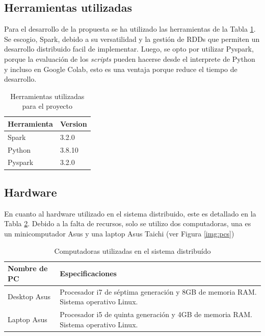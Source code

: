 \subsection{Herramientas utilizadas}

Para el desarrollo de la propuesta se ha utilizado las herramientas de la Tabla \ref{tab:tools}. Se escogio, Spark, debido a su versatilidad y la gestión de RDDs que permiten un desarrollo distribuido facil de implementar. Luego, se opto por utilizar Pyspark, porque la evaluación de los \textit{scripts} pueden hacerse desde el interprete de Python y incluso en Google Colab, esto es una ventaja porque reduce el tiempo de desarrollo.\\

\begin{table}[H]
	\centering
	\caption{Herramientas utilizadas para el proyecto}
	\label{tab:tools}
	\begin{tabular}{ll}
		\textbf{Herramienta} & \textbf{Version}
		\\ \hline
		Spark       & 3.2.0   \\
		Python      & 3.8.10  \\
		Pyspark     & 3.2.0  
	\end{tabular}
\end{table}

\subsection{Hardware}

En cuanto al hardware utilizado en el sistema distribuido, este es detallado en la Tabla \ref{tab:pcs}. Debido a la falta de recursos, solo se utilizo dos computadoras, una es un minicomputador Asus y una laptop Asus Taichi (ver Figura \ref{img:pcs})\\


\begin{table}[H]
	\centering
	\caption{Computadoras utilizadas en el sistema distribuído}
	\label{tab:pcs}
	\begin{tabular}{lp{8cm}}
		\textbf{Nombre de PC} & \textbf{Especificaciones}
		\\ \hline
		Desktop Asus      & Procesador i7 de séptima generación y 8GB de memoria RAM. Sistema operativo Linux.   \\
		Laptop Asus      & Procesador i5 de quinta generación y 4GB de memoria RAM. Sistema operativo Linux.\\
	\end{tabular}
\end{table}


